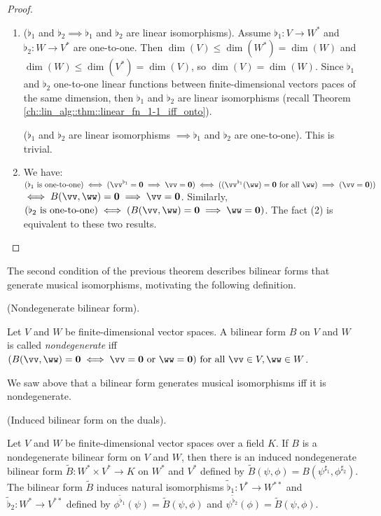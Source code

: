 \begin{proof}
    \mbox{} \\
    \begin{enumerate}
        \item ($\flat_1$ and $\flat_2 \implies \flat_1$ and $\flat_2$ are linear isomorphisms). Assume $\flat_1:V \rightarrow W^*$ and $\flat_2:W \rightarrow V^*$ are one-to-one. Then $\dim(V) \leq \dim(W^*) = \dim(W)$ and $\dim(W) \leq \dim(V^*) = \dim(V)$, so $\dim(V) = \dim(W)$. Since $\flat_1$ and $\flat_2$ one-to-one linear functions between finite-dimensional vectors paces of the same dimension, then $\flat_1$ and $\flat_2$ are linear isomorphisms (recall Theorem \ref{ch::lin_alg::thm::linear_fn_1-1_iff_onto}).

        ($\flat_1$ and $\flat_2$ are linear isomorphisms $\implies \flat_1$ and $\flat_2$ are one-to-one). This is trivial.
        
        \item We have: $(\flat_1 \text{ is one-to-one}) \iff (\vv^{\flat_1} = \mathbf{0} \implies \vv = \mathbf{0}) \iff ((\vv^{\flat_1}(\ww) = \mathbf{0} \text{ for all $\ww$}) \implies (\vv = \mathbf{0}))$ \\ $\iff B(\vv, \ww) = \mathbf{0} \implies \vv = \mathbf{0}$. Similarly, $(\flat_2 \text{ is one-to-one}) \iff (B(\vv, \ww) = \mathbf{0} \implies \ww = \mathbf{0})$. The fact (2) is equivalent to these two results.
    \end{enumerate}
\end{proof}

The second condition of the previous theorem describes bilinear forms that generate musical isomorphisms, motivating the following definition.

\begin{defn}
    (Nondegenerate bilinear form).
    
    Let $V$ and $W$ be finite-dimensional vector spaces. A bilinear form $B$ on $V$ and $W$ is called \textit{nondegenerate} iff $(B(\vv, \ww) = \mathbf{0} \iff \vv = \mathbf{0} \text{ or } \ww = \mathbf{0}) \text{ for all } \vv \in V, \ww \in W$.

    We saw above that a bilinear form generates musical isomorphisms iff it is nondegenerate.
\end{defn}

\begin{theorem}
\label{ch::bilinear_forms_metric_tensors::induced_bilinear_form_on_duals}
    (Induced bilinear form on the duals).
    
    Let $V$ and $W$ be finite-dimensional vector spaces over a field $K$. If $B$ is a nondegenerate bilinear form on $V$ and $W$, then there is an induced nondegenerate bilinear form $\widetilde{B}:W^* \times V^* \rightarrow K$ on $W^*$ and $V^*$ defined by $\widetilde{B}(\psi, \phi) = B(\psi^{\sharp_1}, \phi^{\sharp_2})$. The bilinear form $\widetilde{B}$ induces natural isomorphisms $\widetilde{\flat}_1:V^* \rightarrow W^{**}$ and $\widetilde{\flat}_2:W^* \rightarrow V^{**}$ defined by $\phi^{\widetilde{\flat}_1}(\psi) = \widetilde{B}(\psi, \phi)$ and $\psi^{\widetilde{\flat}_2}(\phi) = \widetilde{B}(\psi, \phi)$.
\end{theorem}

